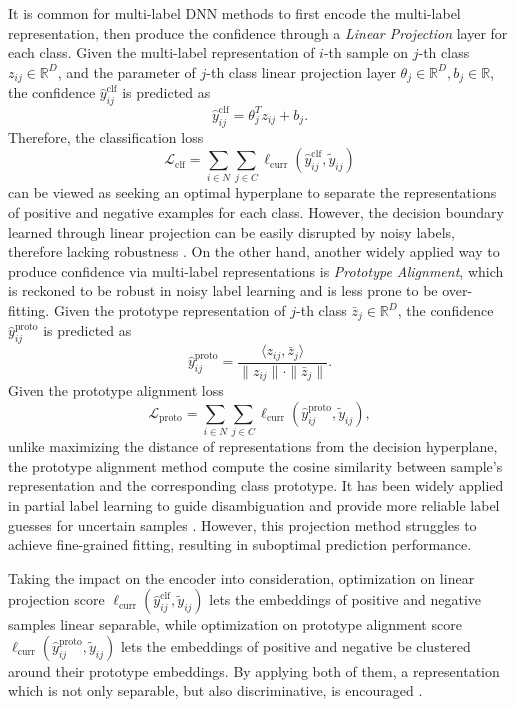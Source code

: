 \documentclass[letterpaper]{article} %
\begin{document}
  It is common for multi-label DNN methods to first encode the multi-label representation, then produce the confidence through a \textit{Linear Projection} layer for each class. Given the multi-label representation of \(i\)-th sample on \(j\)-th class $z_{ij} \in \mathbb{R}^{D}$, and the parameter of \(j\)-th class linear projection layer $\theta_j \in \mathbb{R}^D, b_j \in \mathbb{R}$, the confidence $\hat y_{ij}^\text{clf}$ is predicted as
  \begin{equation}
    \hat y_{ij}^\text{clf} = \theta_j^T z_{ij} + b_j.
  \end{equation}
  Therefore, the classification loss 
  \begin{equation}
    \mathcal{L}_\text{clf} = \sum_{i \in N} \sum_{j \in C} \ell_\text{curr}(\hat y_{ij}^\text{clf}, \tilde y_{ij})
  \end{equation}
  can be viewed as seeking an optimal hyperplane to separate the representations of positive and negative examples for each class. However, the decision boundary learned through linear projection can be easily disrupted by noisy labels, therefore lacking robustness \cite{CTRR}. On the other hand, another widely applied way to produce confidence via multi-label representations is \textit{Prototype Alignment}, which is reckoned to be robust in noisy label learning and is less prone to be over-fitting. Given the prototype representation of \(j\)-th class $\bar z_{j} \in \mathbb{R}^{D}$, the confidence $\hat y_{ij}^\text{proto}$ is predicted as
  \begin{equation}
    \hat y_{ij}^\text{proto} = \frac{\langle z_{ij}, \bar z_{j} \rangle}{ \|z_{ij} \| \cdot \| \bar z_{j} \|}.
  \end{equation}
  Given the prototype alignment loss 
  \begin{equation}
    \mathcal{L}_\text{proto} = \sum_{i \in N} \sum_{j \in C} \ell_\text{curr}(\hat y_{ij}^\text{proto}, \tilde y_{ij}),
  \end{equation}
  unlike maximizing the distance of representations from the decision hyperplane, the prototype alignment method compute the cosine similarity between sample's representation and the corresponding class prototype. It has been widely applied in partial label learning to guide disambiguation and provide more reliable label guesses for uncertain samples \cite{PiCO, PiCO-plus, CEL}. However, this projection method struggles to achieve fine-grained fitting, resulting in suboptimal prediction performance.

  Taking the impact on the encoder into consideration, optimization on linear projection score
    $\ell_\text{curr}(\hat y_{ij}^\text{clf}, \tilde y_{ij})$
  lets the embeddings of positive and negative samples linear separable, while optimization on prototype alignment score
    $\ell_\text{curr}(\hat y_{ij}^\text{proto}, \tilde y_{ij})$
  lets the embeddings of positive and negative be clustered around their prototype embeddings. By applying both of them, 
  a representation which is not only separable, but also discriminative, is encouraged \cite{CenterLoss}. 
\end{document}
